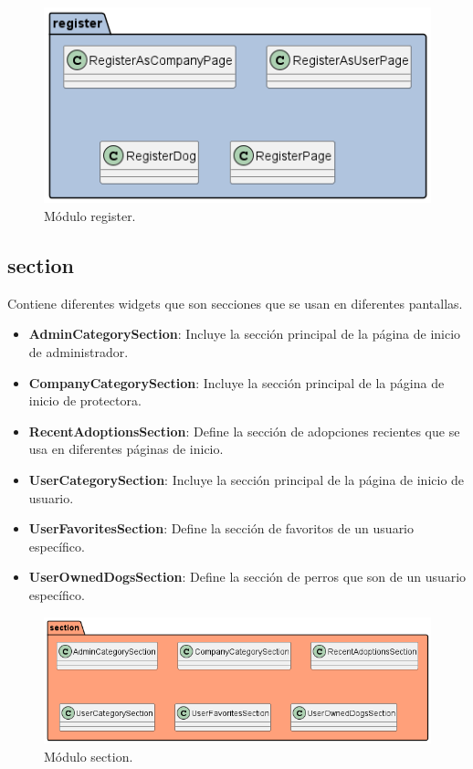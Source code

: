 \documentclass[a4paper, 12pt]{article}
\begin{document}
\begin{figure}[H]
	\begin{center}
		{\includegraphics[width=0.8\linewidth]{diagram/Register.png}\par}
		\caption{Módulo register.}
	\end{center}
\end{figure}

\subsection*{section}

Contiene diferentes widgets que son secciones que se usan en diferentes pantallas.

\begin{itemize}[noitemsep]
	\item \textbf{AdminCategorySection}: Incluye la sección principal de la página de inicio de administrador.
	\item \textbf{CompanyCategorySection}: Incluye la sección principal de la página de inicio de protectora.
	\item \textbf{RecentAdoptionsSection}:  Define la sección de adopciones recientes que se usa en diferentes páginas de inicio.
	\item \textbf{UserCategorySection}:  Incluye la sección principal de la página de inicio de usuario.
	\item \textbf{UserFavoritesSection}:  Define la sección de favoritos de un usuario específico.
	\item \textbf{UserOwnedDogsSection}:  Define la sección de perros que son de un usuario específico.
\end{itemize}


\begin{figure}[H]
	\begin{center}
		{\includegraphics[width=0.8\linewidth]{diagram/Section.png}\par}
		\caption{Módulo section.}
	\end{center}
\end{figure}
\end{document}
